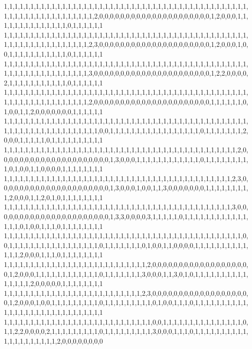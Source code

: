 1,1,1,1,1,1,1,1,1,1,1,1,1,1,1,1,1,1,1,1,1,1,1,1,1,1,1,1,1,1,1,1,1,1,1,1,1,1,1,1,1,1,1,1,1,1,1,1,1,1,1,1,1,1,1,1,1,1,1,1,1,1,1,2,0,0,0,0,0,0,0,0,0,0,0,0,0,0,0,0,0,0,0,0,0,1,2,0,0,0,1,1,1,1,1,1,1,1,1,1,1,1,1,1,0,1,1,1,1,1,1
1,1,1,1,1,1,1,1,1,1,1,1,1,1,1,1,1,1,1,1,1,1,1,1,1,1,1,1,1,1,1,1,1,1,1,1,1,1,1,1,1,1,1,1,1,1,1,1,1,1,1,1,1,1,1,1,1,1,1,1,1,1,2,3,0,0,0,0,0,0,0,0,0,0,0,0,0,0,0,0,0,0,0,0,0,1,2,0,0,0,1,0,0,1,1,1,1,1,1,1,1,1,1,1,0,1,1,1,1,1,1
1,1,1,1,1,1,1,1,1,1,1,1,1,1,1,1,1,1,1,1,1,1,1,1,1,1,1,1,1,1,1,1,1,1,1,1,1,1,1,1,1,1,1,1,1,1,1,1,1,1,1,1,1,1,1,1,1,1,1,1,1,1,3,0,0,0,0,0,0,0,0,0,0,0,0,0,0,0,0,0,0,0,0,0,0,1,2,2,0,0,0,0,2,1,1,1,1,1,1,1,1,1,1,1,0,1,1,1,1,1,1
1,1,1,1,1,1,1,1,1,1,1,1,1,1,1,1,1,1,1,1,1,1,1,1,1,1,1,1,1,1,1,1,1,1,1,1,1,1,1,1,1,1,1,1,1,1,1,1,1,1,1,1,1,1,1,1,1,1,1,1,1,1,2,0,0,0,0,0,0,0,0,0,0,0,0,0,0,0,0,0,0,0,0,0,0,1,1,1,1,1,1,0,1,0,0,1,1,2,0,0,0,0,0,0,0,1,1,1,1,1,1
1,1,1,1,1,1,1,1,1,1,1,1,1,1,1,1,1,1,1,1,1,1,1,1,1,1,1,1,1,1,1,1,1,1,1,1,1,1,1,1,1,1,1,1,1,1,1,1,1,1,1,1,1,1,1,1,1,1,1,1,1,1,1,1,0,0,1,1,1,1,1,1,1,1,1,1,1,1,1,1,1,1,1,0,1,1,1,1,1,1,1,2,0,0,0,1,1,1,1,1,0,1,1,1,1,1,1,1,1,1,1
1,1,1,1,1,1,1,1,1,1,1,1,1,1,1,1,1,1,1,1,1,1,1,1,1,1,1,1,1,1,1,1,1,1,1,1,1,1,1,1,1,1,1,1,2,0,0,0,0,0,0,0,0,0,0,0,0,0,0,0,0,0,0,0,0,0,1,3,0,0,0,1,1,1,1,1,1,1,1,1,1,1,1,0,1,1,1,1,1,1,1,1,1,0,1,0,0,1,1,0,0,0,0,1,1,1,1,1,1,1,1
1,1,1,1,1,1,1,1,1,1,1,1,1,1,1,1,1,1,1,1,1,1,1,1,1,1,1,1,1,1,1,1,1,1,1,1,1,1,1,1,1,1,1,2,3,0,0,0,0,0,0,0,0,0,0,0,0,0,0,0,0,0,0,0,0,0,1,3,0,0,0,1,0,0,1,1,3,0,0,0,0,0,0,0,1,1,1,1,1,1,1,1,1,2,0,0,0,1,1,2,0,1,0,1,1,1,1,1,1,1,1
1,1,1,1,1,1,1,1,1,1,1,1,1,1,1,1,1,1,1,1,1,1,1,1,1,1,1,1,1,1,1,1,1,1,1,1,1,1,1,1,1,1,1,3,0,0,0,0,0,0,0,0,0,0,0,0,0,0,0,0,0,0,0,0,0,0,1,3,3,0,0,0,0,3,1,1,1,1,1,0,1,1,1,1,1,1,1,1,1,1,1,1,1,1,1,0,1,0,0,1,1,1,0,1,1,1,1,1,1,1,1
1,1,1,1,1,1,1,1,1,1,1,1,1,1,1,1,1,1,1,1,1,1,1,1,1,1,1,1,1,1,1,1,1,1,1,1,1,1,1,1,1,1,1,1,1,0,0,1,1,1,1,1,1,1,1,1,1,1,1,1,1,1,1,1,0,1,1,1,1,1,1,1,0,1,0,0,1,1,0,0,0,0,1,1,1,1,1,1,1,1,1,1,1,1,1,2,0,0,0,1,1,1,0,1,1,1,1,1,1,1,1
1,1,1,1,1,1,1,1,1,1,1,1,1,1,1,1,1,1,1,1,1,1,1,1,1,1,1,2,0,0,0,0,0,0,0,0,0,0,0,0,0,0,0,0,0,0,0,1,2,0,0,0,1,1,1,1,1,1,1,1,1,1,1,1,0,1,1,1,1,1,1,1,3,0,0,0,1,1,3,0,1,0,1,1,1,1,1,1,1,1,1,1,1,1,1,1,1,2,0,0,0,0,0,1,1,1,1,1,1,1,1
1,1,1,1,1,1,1,1,1,1,1,1,1,1,1,1,1,1,1,1,1,1,1,1,1,1,2,3,0,0,0,0,0,0,0,0,0,0,0,0,0,0,0,0,0,0,0,1,2,0,0,0,1,0,0,1,1,1,1,1,1,1,1,1,0,1,1,1,1,1,1,1,1,1,0,1,0,0,1,1,1,0,1,1,1,1,1,1,1,1,1,1,1,1,1,1,1,1,1,1,1,1,1,1,1,1,1,1,1,1,1
1,1,1,1,1,1,1,1,1,1,1,1,1,1,1,1,1,1,1,1,1,1,1,1,1,1,1,1,0,0,1,1,1,1,1,1,1,1,1,1,1,1,1,1,1,0,1,1,2,2,0,0,0,0,2,1,1,1,1,1,1,1,1,1,0,1,1,1,1,1,1,1,1,1,3,0,0,0,1,1,1,0,1,1,1,1,1,1,1,1,1,1,1,1,1,1,1,1,1,1,1,1,2,0,0,0,0,0,0,0,0
